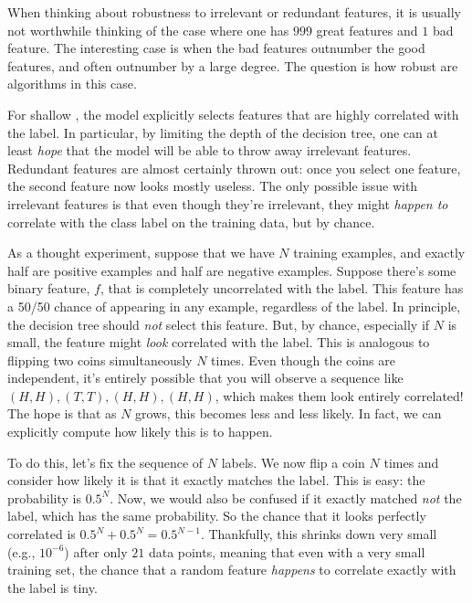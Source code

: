 

When thinking about robustness to irrelevant or redundant features, it
is usually not worthwhile thinking of the case where one has $999$
great features and $1$ bad feature.  The interesting case is when the
bad features outnumber the good features, and often outnumber by a
large degree.  %
The
question is how robust are algorithms in this case.

For shallow , the model explicitly selects
features that are highly correlated with the label.  In particular, by
limiting the depth of the decision tree, one can at least \emph{hope}
that the model will be able to throw away irrelevant features.
Redundant features are almost certainly thrown out: once you select
one feature, the second feature now looks mostly useless.  The only
possible issue with irrelevant features is that even though they're
irrelevant, they might \emph{happen to} correlate with the class label on
the training data, but by chance.

As a thought experiment, suppose that we have $N$ training examples,
and exactly half are positive examples and half are negative
examples.  Suppose there's some binary feature, $f$, that is completely
uncorrelated with the label.  This feature has a 50/50 chance of
appearing in any example, regardless of the label.  In principle, the
decision tree should \emph{not} select this feature.  But, by chance,
especially if $N$ is small, the feature might \emph{look} correlated
with the label.  This is analogous to flipping two coins
simultaneously $N$ times.  Even though the coins are independent, it's
entirely possible that you will observe a sequence like $(H,H), (T,T),
(H,H), (H,H)$, which makes them look entirely correlated!  The hope is
that as $N$ grows, this becomes less and less likely.  In fact, we can
explicitly compute how likely this is to happen.

To do this, let's fix the sequence of $N$ labels.  We now flip a coin
$N$ times and consider how likely it is that it exactly matches the
label.  This is easy: the probability is $0.5^N$.  Now, we would also
be confused if it exactly matched \emph{not} the label, which has the
same probability.  So the chance that it looks perfectly correlated is
$0.5^N + 0.5^N = 0.5^{N-1}$.  Thankfully, this shrinks down very small
(e.g., $10^{-6}$) after only $21$ data points, meaning that even with a very small training set, the chance that a random feature \emph{happens} to correlate exactly with the label is tiny.

